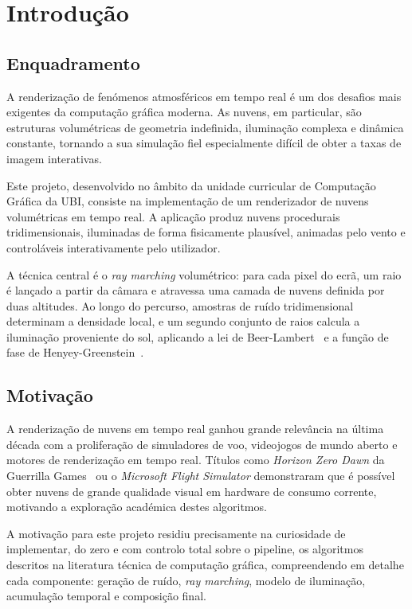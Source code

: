 \chapter{Introdução}
\label{chap:intro}

\section{Enquadramento}
\label{sec:enquad}

A renderização de fenómenos atmosféricos em tempo real é um dos desafios mais exigentes da computação gráfica moderna. As nuvens, em particular, são estruturas volumétricas de geometria indefinida, iluminação complexa e dinâmica constante, tornando a sua simulação fiel especialmente difícil de obter a taxas de imagem interativas.

Este projeto, desenvolvido no âmbito da unidade curricular de Computação Gráfica da \ac{UBI}, consiste na implementação de um renderizador de nuvens volumétricas em tempo real. A aplicação produz nuvens procedurais tridimensionais, iluminadas de forma fisicamente plausível, animadas pelo vento e controláveis interativamente pelo utilizador.

A técnica central é o \emph{ray marching} volumétrico: para cada pixel do ecrã, um raio é lançado a partir da câmara e atravessa uma camada de nuvens definida por duas altitudes. Ao longo do percurso, amostras de ruído tridimensional determinam a densidade local, e um segundo conjunto de raios calcula a iluminação proveniente do sol, aplicando a lei de Beer-Lambert~\cite{max1995} e a função de fase de Henyey-Greenstein~\cite{hg1941}.

\section{Motivação}
\label{sec:mot}

A renderização de nuvens em tempo real ganhou grande relevância na última década com a proliferação de simuladores de voo, videojogos de mundo aberto e motores de renderização em tempo real. Títulos como \textit{Horizon Zero Dawn} da Guerrilla Games~\cite{schneider2015} ou o \textit{Microsoft Flight Simulator} demonstraram que é possível obter nuvens de grande qualidade visual em hardware de consumo corrente, motivando a exploração académica destes algoritmos.

A motivação para este projeto residiu precisamente na curiosidade de implementar, do zero e com controlo total sobre o pipeline, os algoritmos descritos na literatura técnica de computação gráfica, compreendendo em detalhe cada componente: geração de ruído, \emph{ray marching}, modelo de iluminação, acumulação temporal e composição final.

